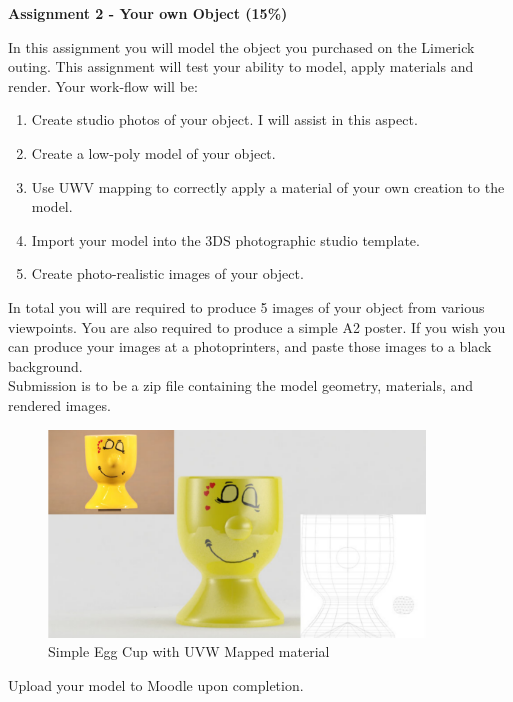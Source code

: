 

\begin{flushleft}
\Large\textbf{Assignment 2 - Your own Object (15\%)}\\
\end{flushleft}

In this assignment you will model the object you purchased on the Limerick outing.  This assignment will test your ability to model, apply materials and render.  Your work-flow will be:
\begin{enumerate}
	\item Create studio photos of your object. I will assist in this aspect.
	\item Create a low-poly model of your object.
	\item Use UWV mapping to correctly apply a material of your own creation to the model.
	\item Import your model into the 3DS photographic studio template.
	\item Create photo-realistic images of your object.
\end{enumerate}

In total you will are required to produce 5 images of your object from various viewpoints.  You are also required to produce a simple A2 poster.  If you wish you can produce your images at a photoprinters, and paste those images to a black background.\\

Submission is to be a zip file containing the model geometry, materials, and rendered images.\\

\begin{figure}[hb]
	\centering
		\includegraphics[width=10cm]{img/eggcup.jpg}
		\caption{Simple Egg Cup with UVW Mapped material}
	\label{fig:Egg Cup}
\end{figure}

Upload your model to Moodle upon completion.







